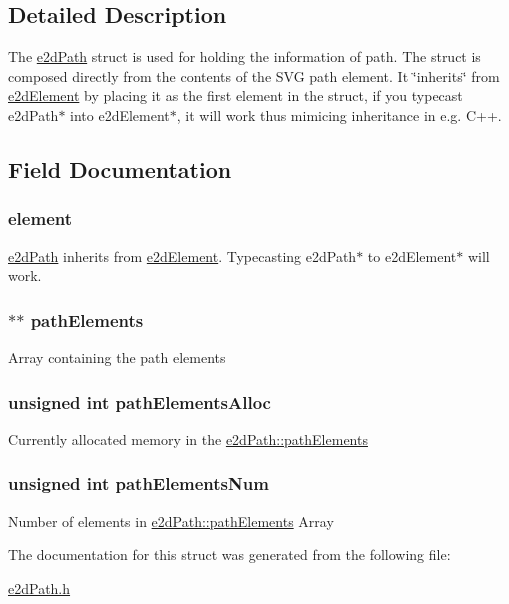 \subsection{Detailed Description}
The \hyperlink{structe2dPath}{e2d\-Path} struct is used for holding the information of path. The struct is composed directly from the contents of the S\-V\-G path element. It \char`\"{}inherits\char`\"{} from \hyperlink{structe2dElement}{e2d\-Element} by placing it as the first element in the struct, if you typecast e2d\-Path$\ast$ into e2d\-Element$\ast$, it will work thus mimicing inheritance in e.\-g. C++. 

\subsection{Field Documentation}
\hypertarget{structe2dPath_a55bc7a3a0af41fba9e5b91f390c5928c}{
\subsubsection[{element}]{ {\bf element}}}\label{structe2dPath_a55bc7a3a0af41fba9e5b91f390c5928c}
\hyperlink{structe2dPath}{e2d\-Path} inherits from \hyperlink{structe2dElement}{e2d\-Element}. Typecasting e2d\-Path$\ast$ to e2d\-Element$\ast$ will work. \hypertarget{structe2dPath_ac0c8a45ff4f8d02e557fb33887743439}{
\subsubsection[{path\-Elements}]{$\ast$$\ast$ {\bf path\-Elements}}}\label{structe2dPath_ac0c8a45ff4f8d02e557fb33887743439}
Array containing the path elements \hypertarget{structe2dPath_a0922122c6ccf006fad850c6b30ae5328}{
\subsubsection[{path\-Elements\-Alloc}]{\setlength{\rightskip}{0pt plus 5cm}unsigned int {\bf path\-Elements\-Alloc}}}\label{structe2dPath_a0922122c6ccf006fad850c6b30ae5328}
Currently allocated memory in the \hyperlink{structe2dPath_ac0c8a45ff4f8d02e557fb33887743439}{e2d\-Path\-::path\-Elements} \hypertarget{structe2dPath_a225f71916c061d0c977a1e5fae371a99}{
\subsubsection[{path\-Elements\-Num}]{\setlength{\rightskip}{0pt plus 5cm}unsigned int {\bf path\-Elements\-Num}}}\label{structe2dPath_a225f71916c061d0c977a1e5fae371a99}
Number of elements in \hyperlink{structe2dPath_ac0c8a45ff4f8d02e557fb33887743439}{e2d\-Path\-::path\-Elements} Array 

The documentation for this struct was generated from the following file\-:\begin{DoxyCompactItemize}
\item 
\hyperlink{e2dPath_8h}{e2d\-Path.\-h}\end{DoxyCompactItemize}
